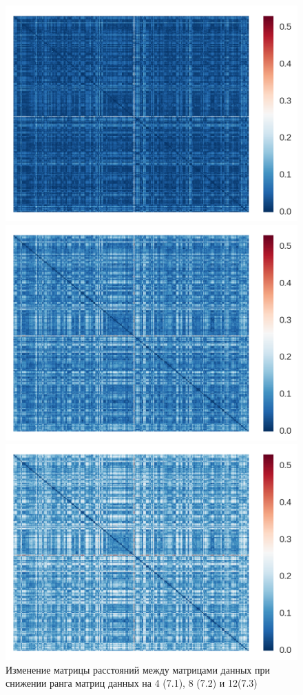 \begin{figure}[!h]
  \includegraphics[width=\linewidth]{img/diff_drop_4.png}
  \caption{}
\endminipage\hfill
{}
  \includegraphics[width=\linewidth]{img/diff_drop_8.png}
  \caption{}
\endminipage\hfill
{}
  \includegraphics[width=\linewidth]{img/diff_drop_12.png}
  \caption{}
\endminipage
\caption{Изменение матрицы расстояний между матрицами данных при снижении ранга матриц данных на 4 (7.1), 8 (7.2) и 12(7.3)}
\end{figure}

